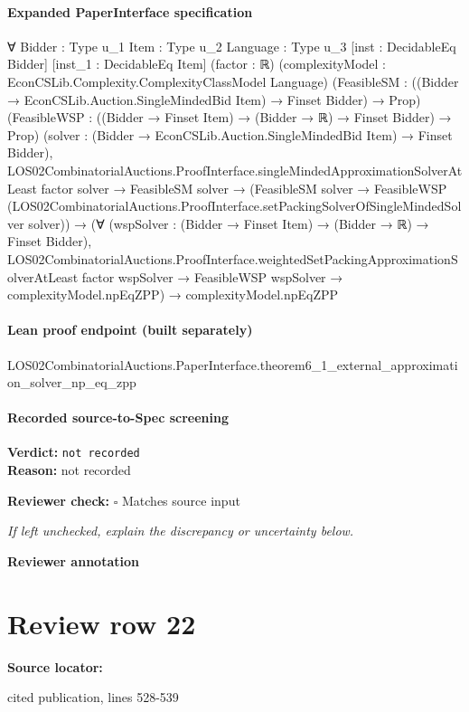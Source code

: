 \documentclass[10pt]{article}
\newcommand{\reviewerbox}{%
  \par\noindent\fbox{\parbox{0.96\linewidth}{\rule{0pt}{0.38in}}}\par
}
\newcommand{\reviewmatch}[1]{%
  \par\noindent\textbf{Reviewer check:} $\square$\; #1\par
  \noindent\emph{If left unchecked, explain the discrepancy or uncertainty below.}\par
}
\begin{document}
\paragraph{Expanded PaperInterface specification}
\begin{ReviewVerbatim}
∀ {Bidder : Type u_1} {Item : Type u_2} {Language : Type u_3} [inst : DecidableEq Bidder] [inst_1 : DecidableEq Item]
  (factor : ℝ) (complexityModel : EconCSLib.Complexity.ComplexityClassModel Language)
  (FeasibleSM : ((Bidder → EconCSLib.Auction.SingleMindedBid Item) → Finset Bidder) → Prop)
  (FeasibleWSP : ((Bidder → Finset Item) → (Bidder → ℝ) → Finset Bidder) → Prop)
  (solver : (Bidder → EconCSLib.Auction.SingleMindedBid Item) → Finset Bidder),
  LOS02CombinatorialAuctions.ProofInterface.singleMindedApproximationSolverAtLeast factor solver →
    FeasibleSM solver →
      (FeasibleSM solver →
          FeasibleWSP (LOS02CombinatorialAuctions.ProofInterface.setPackingSolverOfSingleMindedSolver solver)) →
        (∀ (wspSolver : (Bidder → Finset Item) → (Bidder → ℝ) → Finset Bidder),
            LOS02CombinatorialAuctions.ProofInterface.weightedSetPackingApproximationSolverAtLeast factor wspSolver →
              FeasibleWSP wspSolver → complexityModel.npEqZPP) →
          complexityModel.npEqZPP
\end{ReviewVerbatim}

\paragraph{Lean proof endpoint (built separately)}\begin{ReviewVerbatim}
LOS02CombinatorialAuctions.PaperInterface.theorem6_1_external_approximation_solver_np_eq_zpp
\end{ReviewVerbatim}

\paragraph{Recorded source-to-Spec screening}
\textbf{Verdict:} \texttt{not recorded}
\\
\textbf{Reason:} not recorded
\reviewmatch{Matches source input}
\noindent\textbf{Reviewer annotation}\par
\reviewerbox
\clearpage
\hypertarget{source-claim-9e8344eee2eaa4e1}{}
\section*{Review row 22}
\textbf{Source locator:} {\footnotesize\raggedright cited publication, lines 528-\allowbreak{}539\par}
\end{document}
